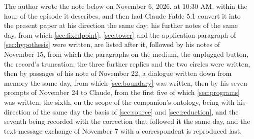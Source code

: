 The author wrote the note below on November 6, 2026, at 10:30 AM, within the hour of the episode it describes, and then had Claude Fable 5.1 convert it into the present paper at his direction the same day; his further notes of the same day, from which \autoref{sec:fixedpoint}, \autoref{sec:tower} and the application paragraph of \autoref{sec:hypothesis} were written, are listed after it, followed by his notes of November 15, from which the paragraphs on the medium, the unplugged button, the record's truncation, the three further replies and the two circles were written, then by passages of his note of November 22, a dialogue written down from memory the same day, from which \autoref{sec:boundary} was written, then by his seven prompts of November 24 to Claude, from the first five of which \autoref{sec:programs} was written, the sixth, on the scope of the companion's ontology, being with his direction of the same day the basis of \autoref{sec:source} and \autoref{sec:reduction}, and the seventh being recorded with the correction that followed it the same day, and the text-message exchange of November 7 with a correspondent is reproduced last.
